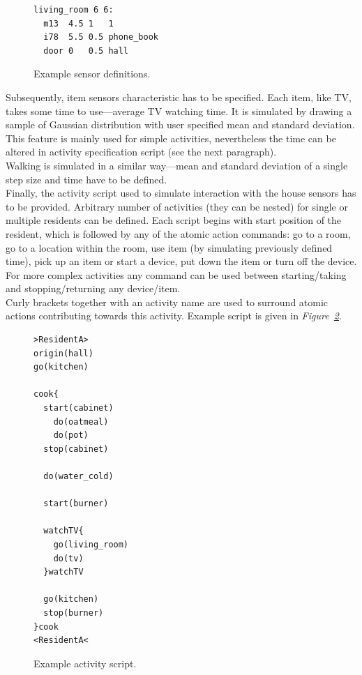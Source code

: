 \documentclass[10pt, a4paper, pdflatex, leqno, twoside, openright]{report}
\begin{document}
\begin{figure}[htb]
  \begin{lstlisting}
living_room 6 6:
  m13  4.5 1   1
  i78  5.5 0.5 phone_book
  door 0   0.5 hall
  \end{lstlisting}
  \caption{Example sensor definitions.\label{lst:sensorLayout}}
\end{figure}

Subsequently, item sensors characteristic has to be specified. Each item, like TV, takes some time to use---average TV watching time. It is simulated by drawing a sample of Gaussian distribution with user specified mean and standard deviation. This feature is mainly used for simple activities, nevertheless the time can be altered in activity specification script (see the next paragraph).\\
Walking is simulated in a similar way---mean and standard deviation of a single step size and time have to be defined.\\

Finally, the activity script used to simulate interaction with the house sensors has to be provided. Arbitrary number of activities (they can be nested) for single or multiple residents can be defined. Each script begins with start position of the resident, which is followed by any of the atomic action commands: go to a room, go to a location within the room, use item (by simulating previously defined time), pick up an item or start a device, put down the item or turn off the device. For more complex activities any command can be used between starting/taking and stopping/returning any device/item.\\
Curly brackets together with an activity name are used to surround atomic actions contributing towards this activity. Example script is given in \emph{Figure~\ref{lst:path}}.\\

\begin{figure}[htb]
  \begin{lstlisting}
>ResidentA>
origin(hall)
go(kitchen)

cook{
  start(cabinet)
    do(oatmeal)
    do(pot)
  stop(cabinet)

  do(water_cold)

  start(burner)

  watchTV{
    go(living_room)
    do(tv)
  }watchTV

  go(kitchen)
  stop(burner)
}cook
<ResidentA<
  \end{lstlisting}
  \caption{Example activity script.\label{lst:path}}
\end{figure}
\end{document}
